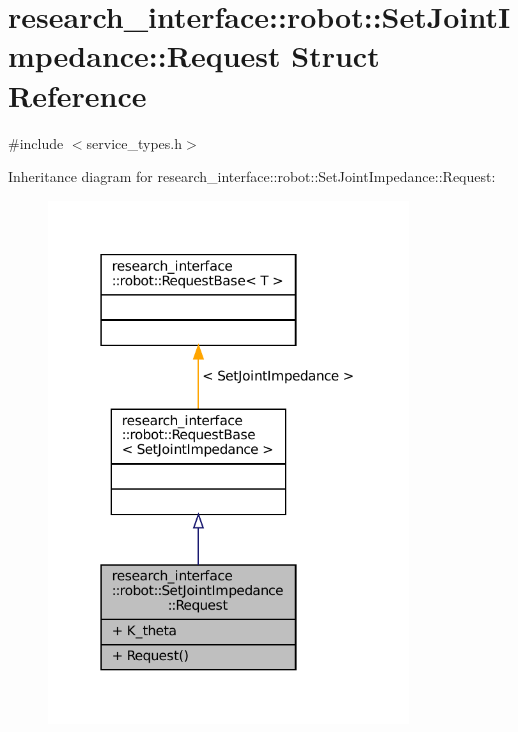 \hypertarget{structresearch__interface_1_1robot_1_1SetJointImpedance_1_1Request}{}\section{research\+\_\+interface\+:\+:robot\+:\+:Set\+Joint\+Impedance\+:\+:Request Struct Reference}
\label{structresearch__interface_1_1robot_1_1SetJointImpedance_1_1Request}


{\ttfamily \#include $<$service\+\_\+types.\+h$>$}



Inheritance diagram for research\+\_\+interface\+:\+:robot\+:\+:Set\+Joint\+Impedance\+:\+:Request\+:
\nopagebreak
\begin{figure}[H]
\begin{center}
\leavevmode
\includegraphics[width=271pt]{structresearch__interface_1_1robot_1_1SetJointImpedance_1_1Request__inherit__graph}
\end{center}
\end{figure}


